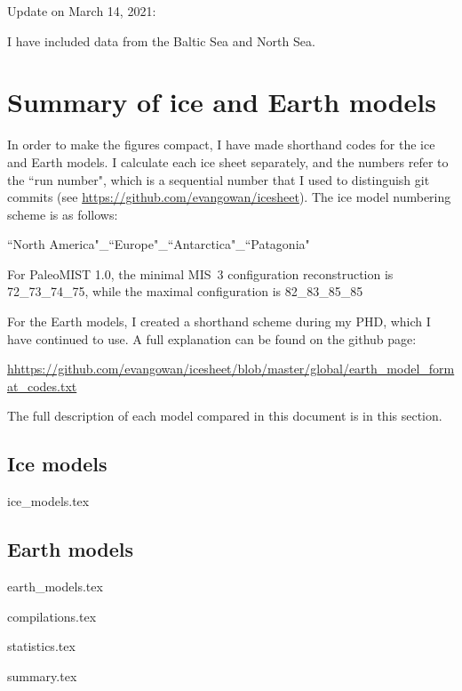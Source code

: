 \documentclass[a4paper,12pt]{article}
\begin{document}
Update on March 14, 2021:

I have included data from the Baltic Sea and North Sea.


\section{Summary of ice and Earth models}


In order to make the figures compact, I have made shorthand codes for the ice and Earth models. I calculate each ice sheet separately, and the numbers refer to the ``run number", which is a sequential number that I used to distinguish git commits (see \url{https://github.com/evangowan/icesheet}). The ice model numbering scheme is as follows:

``North America"\_``Europe"\_``Antarctica"\_``Patagonia"

For PaleoMIST 1.0, the minimal MIS~3 configuration reconstruction is 72\_73\_74\_75, while the maximal configuration is 82\_83\_85\_85

For the Earth models, I created a shorthand scheme during my PHD, which I have continued to use. A full explanation can be found on the github page:

\url{hhttps://github.com/evangowan/icesheet/blob/master/global/earth_model_format_codes.txt}

The full description of each model compared in this document is in this section.



\subsection{Ice models}

{ice_models.tex}

\subsection{Earth models}

{earth_models.tex}

\newpage


{compilations.tex}

\newpage

{statistics.tex}


\newpage

{summary.tex}

\clearpage

\newpage



\end{document}
